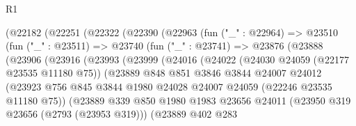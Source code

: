 \begin{lexlean}{R1}
\begin{coremodule}
                      (@22182
                        (@22251
                          (@22322
                            (@22390
                              (@22963
                                (fun ("_" : @22964) =>
                                @23510
                                  (fun ("_" : @23511) =>
                                  @23740
                                    (fun ("_" : @23741) =>
                                    @23876
                                      (@23888
                                        (@23906
                                          (@23916
                                            (@23993
                                              (@23999
                                                (@24016
                                                  (@24022
                                                    (@24030 @24059 (@22177 @23535 @11180 @75))
                                                    (@23889
                                                      @848
                                                      @851
                                                      @3846
                                                      @3844
                                                      @24007
                                                      @24012
                                                      (@23923
                                                        @756
                                                        @845
                                                        @3844
                                                        @1980
                                                        @24028
                                                        @24007
                                                        @24059
                                                        (@22246 @23535 @11180 @75))
                                                      (@23889
                                                        @339
                                                        @850
                                                        @1980
                                                        @1983
                                                        @23656
                                                        @24011
                                                        (@23950 @319 @23656 (@2793 (@23953 @319)))
                                                        (@23889
                                                          @402
                                                          @283

\end{coremodule}
\end{lexlean}
